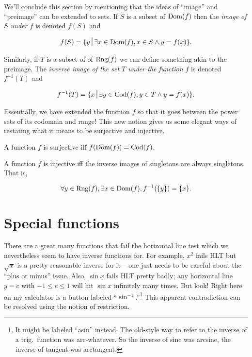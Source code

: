 We'll conclude this section by mentioning that the ideas of ``image''
and ``preimage'' can be extended to sets.  If $S$ is a subset of 
$\mbox{Dom}(f)$ then the \emph{image of $S$ under $f$}
is denoted $f(S)$ and

\[ f(S) = \{ y \suchthat \exists x \in \Dom{f}, x \in S \land y = f(x) \}. \]

Similarly, if $T$ is a subset of of $\mbox{Rng}(f)$ we can define something akin
to the preimage.  The \emph{inverse image
of the set $T$ under the function $f$} is denoted $f^{-1}(T)$ and 

\[ f^{-1}(T) = \{ x \suchthat \exists y \in \Cod{f}, y \in T \land y=f(x) \}.\]

Essentially, we have extended the function $f$ so that it goes between the
power sets of its codomain and range!  This new notion gives us some elegant
ways of restating what it means to be surjective and injective. 

A function $f$ is surjective iff $f(\mbox{Dom}(f)) = \mbox{Cod}(f)$.  

A function $f$ is injective iff the inverse images of singletons
are always singletons.  That is,

\[ \forall y \in \mbox{Rng}(f), \exists x \in \mbox{Dom}(f),  f^{-1}(\{y\}) = \{x\}. \] 

\newpage




\newpage

\section{Special functions}
\label{sec:special_functions}


There are a great many functions that fail the horizontal line test
which we nevertheless seem to have inverse functions for.  For example,
$x^2$ fails HLT but $\sqrt{x}$ is a pretty reasonable inverse for it --
one just needs to be careful about the ``plus or minus'' issue.  Also,
$\sin{x}$ fails HLT pretty badly; any horizontal line $y=c$ with 
$-1 \leq c \leq 1$ will hit $\sin{x}$ infinitely many times.  But look!
Right here on my calculator is a button labeled ``$\sin^{-1}$.''\footnote{It 
might be labeled ``asin'' instead.  The old-style way to refer to the inverse
of a trig.\ function was arc-whatever.  So the inverse of sine was arcsine,
the inverse of tangent was arctangent.}  This apparent contradiction
can be resolved using the notion of restriction.

